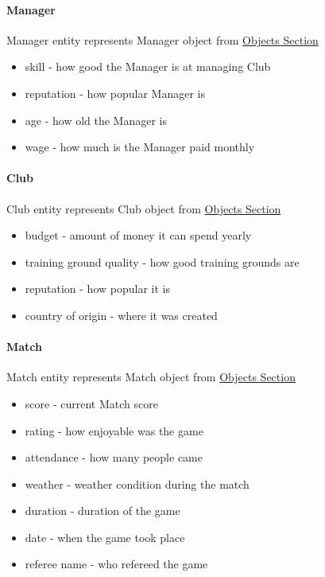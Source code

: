 \documentclass{report}
\begin{document}
\paragraph{Manager}
Manager entity represents Manager object from \hyperref[Objects Section]{Objects Section}
\begin{itemize}
    \item skill - how good the Manager is at managing Club
    \item reputation - how popular Manager is
    \item age - how old the Manager is
    \item wage - how much is the Manager paid monthly
\end{itemize}


\paragraph{Club}
Club entity represents Club object from \hyperref[Objects Section]{Objects Section}
\begin{itemize}
    \item budget - amount of money it can spend yearly
    \item training ground quality - how good training grounds are
    \item reputation - how popular it is
    \item country of origin - where it was created
\end{itemize}


\paragraph{Match}
Match entity represents Match object from \hyperref[Objects Section]{Objects Section}
\begin{itemize}
    \item score - current Match score
    \item rating - how enjoyable was the game
    \item attendance - how many people came
    \item weather - weather condition during the match
    \item duration - duration of the game
    \item date - when the game took place
    \item referee name - who refereed the game
\end{itemize}
\end{document}
